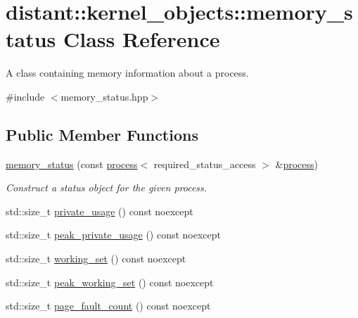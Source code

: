 \hypertarget{classdistant_1_1kernel__objects_1_1memory__status}{}\section{distant\+:\+:kernel\+\_\+objects\+:\+:memory\+\_\+status Class Reference}
\label{classdistant_1_1kernel__objects_1_1memory__status}


A class containing memory information about a process.  




{\ttfamily \#include $<$memory\+\_\+status.\+hpp$>$}

\subsection*{Public Member Functions}
\begin{DoxyCompactItemize}
\item 
\mbox{\hyperlink{classdistant_1_1kernel__objects_1_1memory__status_a267b6aad3f1ea1ff0e8e203c8a66ff35}{memory\+\_\+status}} (const \mbox{\hyperlink{classdistant_1_1kernel__objects_1_1process}{process}}$<$ required\+\_\+status\+\_\+access $>$ \&\mbox{\hyperlink{classdistant_1_1kernel__objects_1_1process}{process}})
\begin{DoxyCompactList}\small\item\em Construct a status object for the given process. \end{DoxyCompactList}\item 
std\+::size\+\_\+t \mbox{\hyperlink{classdistant_1_1kernel__objects_1_1memory__status_a57ec9c390f9e729118138f4feabb6676}{private\+\_\+usage}} () const noexcept
\item 
std\+::size\+\_\+t \mbox{\hyperlink{classdistant_1_1kernel__objects_1_1memory__status_a3bdbed9b383bb506c1bc486585e0f527}{peak\+\_\+private\+\_\+usage}} () const noexcept
\item 
std\+::size\+\_\+t \mbox{\hyperlink{classdistant_1_1kernel__objects_1_1memory__status_a14532979665699d3818cc7319ba95b32}{working\+\_\+set}} () const noexcept
\item 
std\+::size\+\_\+t \mbox{\hyperlink{classdistant_1_1kernel__objects_1_1memory__status_acb17b85966da82e0d4110cc29b7cfa92}{peak\+\_\+working\+\_\+set}} () const noexcept
\item 
std\+::size\+\_\+t \mbox{\hyperlink{classdistant_1_1kernel__objects_1_1memory__status_addb2d11cb7afc3c9a7048818a7a3ee28}{page\+\_\+fault\+\_\+count}} () const noexcept
\end{DoxyCompactItemize}
